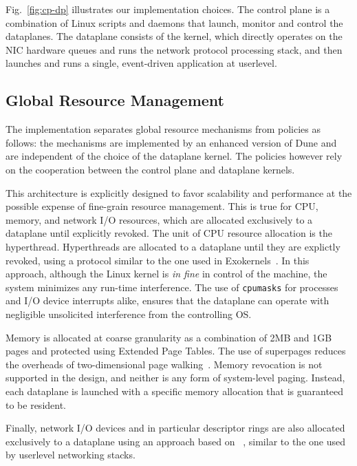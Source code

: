 Fig.~\ref{fig:cp-dp} illustrates our implementation choices.  The \ix
control plane is a combination of Linux scripts and daemons that
launch, monitor and control the \ix dataplanes. The dataplane consists
of the \ix kernel, which directly operates on the NIC hardware queues
and runs the network protocol processing stack, and then launches and
runs a single, event-driven application at userlevel.

\subsection{Global Resource Management}

The implementation separates global resource mechanisms from policies
as follows: the mechanisms are implemented by an enhanced version of
Dune and are independent of the choice of the dataplane kernel.  The
policies however rely on the cooperation between the control plane and
dataplane kernels.

This architecture is explicitly designed to favor scalability and
performance at the possible expense of fine-grain resource management.
This is true for CPU, memory, and network I/O resources, which are
allocated exclusively to a dataplane until explicitly revoked.  The
unit of CPU resource allocation is the hyperthread.  Hyperthreads are
allocated to a dataplane until they are explictly revoked, using a
protocol similar to the one used in
Exokernels~\cite{DBLP:conf/sosp/EnglerKO95}.  In this approach,
although the Linux kernel is \emph{in fine} in control of the
machine, the system minimizes any run-time interference.  The use of
\texttt{cpumasks} for processes and I/O device interrupts alike,
ensures that the dataplane can operate with negligible unsolicited
interference from the controlling OS.

Memory is allocated at coarse granularity as a combination of 2MB and
1GB pages and protected using Extended Page Tables.  The use of
superpages reduces the overheads of two-dimensional page
walking~\cite{DBLP:conf/asplos/BhargavaSSM08}.  Memory revocation is
not supported in the design, and neither is any form of system-level
paging.  Instead, each dataplane is launched with a specific memory
allocation that is guaranteed to be resident.

Finally, network I/O devices and in particular descriptor rings are
also allocated exclusively to a dataplane using an approach based on
~\cite{missing}, similar to the one used by userlevel
networking stacks.

